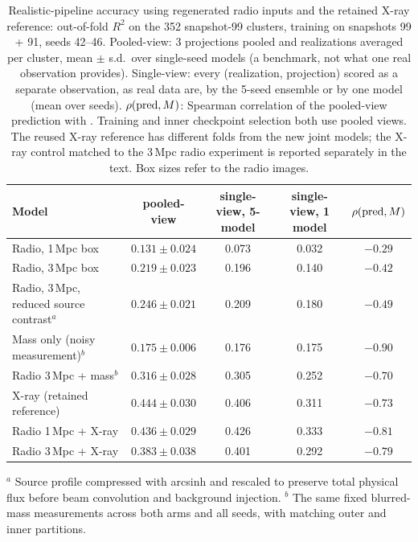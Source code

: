 \begin{table}
  \centering
  \caption{Realistic-pipeline accuracy using regenerated radio inputs and the retained X-ray reference:
  out-of-fold $R^2$ on the 352 snapshot-99 clusters, training on snapshots
  99 + 91, seeds 42--46. Pooled-view: 3 projections pooled and realizations
  averaged per cluster, mean $\pm$ s.d.\ over single-seed models (a
  benchmark, not what one real observation provides). Single-view: every
  (realization, projection) scored as a separate observation, as real data
  are, by the 5-seed ensemble or by one model (mean over seeds).
  $\rho({\rm pred}, M)$: Spearman correlation of the pooled-view prediction
  with \mfive. Training and inner checkpoint selection both use pooled
  views. The reused X-ray reference has different folds from the new
  joint models; the X-ray control matched to the 3\,Mpc radio experiment
  is reported separately in the text. Box sizes refer to the radio images.}
  \label{tab:realistic}
  \begin{tabular}{lcccc}
    \hline
    Model & pooled-view & single-view, 5-model & single-view, 1 model & $\rho({\rm pred}, M)$ \\
    \hline
    Radio, 1\,Mpc box                         & $0.131 \pm 0.024$ & 0.073 & 0.032 & $-0.29$ \\
    Radio, 3\,Mpc box                         & $0.219 \pm 0.023$ & 0.196 & 0.140 & $-0.42$ \\
    Radio, 3\,Mpc, reduced source contrast$^a$& $0.246 \pm 0.021$ & 0.209 & 0.180 & $-0.49$ \\
    Mass only (noisy measurement)$^b$         & $0.175 \pm 0.006$ & 0.176 & 0.175 & $-0.90$ \\
    Radio 3\,Mpc + mass$^b$                   & $0.316 \pm 0.028$ & 0.305 & 0.252 & $-0.70$ \\
    X-ray (retained reference)                 & $0.444 \pm 0.030$ & 0.406 & 0.311 & $-0.73$ \\
    Radio 1\,Mpc + X-ray                      & $0.436 \pm 0.029$ & 0.426 & 0.333 & $-0.81$ \\
    Radio 3\,Mpc + X-ray                      & $0.383 \pm 0.038$ & 0.401 & 0.292 & $-0.79$ \\
    \hline
  \end{tabular}

  \smallskip
  {\footnotesize $^a$ Source profile compressed with arcsinh and rescaled to preserve total physical flux before beam convolution and background injection.
  $^b$ The same fixed blurred-mass measurements across both arms and all seeds, with matching outer and inner partitions.}
\end{table}
